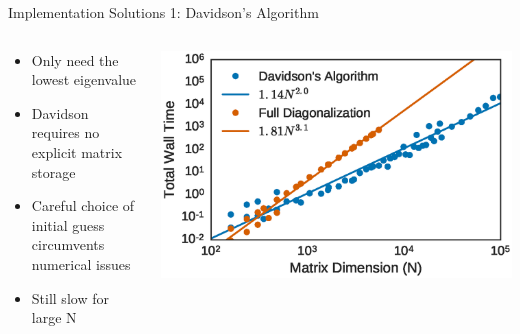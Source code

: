 \documentclass[10pt]{beamer}
\begin{document}
{{{{{{{{{{{\begin{frame}{Implementation Solutions 1: Davidson's Algorithm}
	\begin{columns}[c] %
		\begin{column}{.4\textwidth}
			\begin{itemize}
  			\item {Only need the lowest eigenvalue}
			  \item {Davidson requires no explicit matrix storage}
			  \item {Careful choice of initial guess circumvents numerical issues}
			  \item {Still slow for large N}
			\end{itemize}
		\end{column}
		\begin{column}{0.7\textwidth}
				\vspace{10mm}
		    \begin{overprint}
			    \includegraphics[width=\linewidth]{../figures/dav_vs_exact_scaling.eps}
			\end{overprint}
		\end{column}
	\end{columns}
\end{frame}

}}}}}}}}}}}
\end{document}
